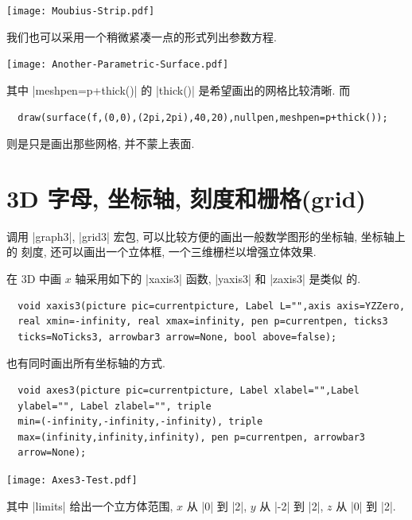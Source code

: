 \documentclass{ctexbook}
\begin{document}
\begin{center}\texttt{[image: Moubius-Strip.pdf]}\end{center}%

我们也可以采用一个稍微紧凑一点的形式列出参数方程.
\begin{center}\texttt{[image: Another-Parametric-Surface.pdf]}\end{center}%

其中 |meshpen=p+thick()| 的 |thick()|  是希望画出的网格比较清晰.  而
\begin{lstlisting}
  draw(surface(f,(0,0),(2pi,2pi),40,20),nullpen,meshpen=p+thick());
\end{lstlisting}
则是只是画出那些网格, 并不蒙上表面.

\section{3D 字母, 坐标轴, 刻度和栅格(grid)}
调用 |graph3|, |grid3| 宏包, 可以比较方便的画出一般数学图形的坐标轴, 坐标轴上的
刻度, 还可以画出一个立体框, 一个三维栅栏以增强立体效果.

在 3D 中画 $x$ 轴采用如下的 |xaxis3| 函数, |yaxis3| 和 |zaxis3| 是类似
的.
\begin{lstlisting}
  void xaxis3(picture pic=currentpicture, Label L="",axis axis=YZZero,
  real xmin=-infinity, real xmax=infinity, pen p=currentpen, ticks3
  ticks=NoTicks3, arrowbar3 arrow=None, bool above=false);
\end{lstlisting}
也有同时画出所有坐标轴的方式.
\begin{lstlisting}
  void axes3(picture pic=currentpicture, Label xlabel="",Label
  ylabel="", Label zlabel="", triple
  min=(-infinity,-infinity,-infinity), triple
  max=(infinity,infinity,infinity), pen p=currentpen, arrowbar3
  arrow=None);
\end{lstlisting}
\begin{center}\texttt{[image: Axes3-Test.pdf]}\end{center}%

其中 |limits| 给出一个立方体范围, $x$ 从 |0| 到 |2|, $y$ 从 |-2| 到 |2|, $z$
从 |0| 到 |2|.
\end{document}
